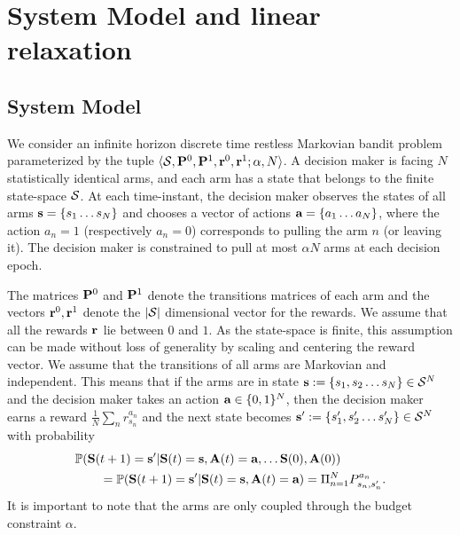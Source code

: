 \section{System Model and linear relaxation}
\label{sec:model}
\subsection{System Model}
We consider an infinite horizon discrete time restless Markovian bandit problem parameterized by the tuple $\langle \mathcal{S}, \mathbf{P}^{0}, \mathbf{P}^{1}, \mathbf{r}^{0}, \mathbf{r}^{1}; \alpha, N \rangle$.  A decision maker is facing $N$ statistically identical arms, and each arm has a state that belongs to the finite state-space $\mathcal{S}$. At each time-instant, the decision maker observes the states of all arms $\textbf{s}=\{s_1\dots s_N\}$ and chooses a vector of actions $\textbf{a}=\{a_1\dots a_N\}$, where the action $a_n=1$ (respectively $a_n=0$) corresponds to pulling the arm $n$ (or leaving it). The decision maker is constrained to pull at most $\alpha N$ arms at each decision epoch. 

The matrices $\mathbf{P}^{0}$ and $\mathbf{P}^{1}$ denote the transitions matrices of each arm and the vectors $\mathbf{r}^{0}, \mathbf{r}^{1}$ denote the $|\mathcal{S}|$ dimensional vector for the rewards. We assume that all the rewards $\mathbf{r}^{}$ lie between $0$ and $1$. As the state-space is finite, this assumption can be made without loss of generality by scaling and centering the reward vector. 
We assume that the transitions of all arms are Markovian and independent. This means that if the arms are in state $\textbf{s} := \{s_1, s_2 \dots s_N\}\in\mathcal{S}^N$ and the decision maker takes an action $\textbf{a}\in\{0,1\}^N$, then the decision maker earns a reward $\frac{1}{N}\sum_{n} r^{a_n}_{s_n}$ and the next state becomes $\textbf{s}':= \{s'_1, s'_2 \dots s'_N\}\in\mathcal{S}^N$ with probability
\begin{equation}\label{EQ:MKEVOL}
    \begin{split}
            &\mathbb{P}(\textbf{S}(t + 1) = \textbf{s}'|\textbf{S}(t) = \textbf{s},\textbf{A}(t) = \textbf{a}, \dots \textbf{S}(0), \textbf{A}(0)) \\
            &\qquad= \mathbb{P}(\textbf{S}(t + 1) = \textbf{s}'|\textbf{S}(t) = \textbf{s},\textbf{A}(t) = \textbf{a})
            = \Pi_{n = 1}^{N} P^{a_n}_{s_n, s_n'}.
    \end{split}
\end{equation}
It is important to note that the arms are only coupled through the budget constraint $\alpha$.


